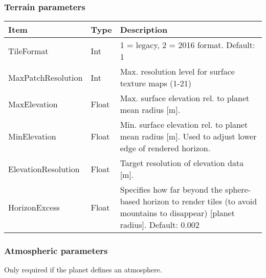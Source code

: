 \documentclass[Orbiter Developer Manual.tex]{subfiles}
\begin{document}
\subsubsection*{Terrain parameters}
	\begin{longtable}{ |p{}|p{}|p{}| }
	\hline\rule{0pt}{2ex}
	\textbf{Item} & \textbf{Type} & \textbf{Description}\\
	\hline\rule{0pt}{2ex}
	TileFormat & Int & 1 = legacy, 2 = 2016 format. Default: 1\\
	\hline\rule{0pt}{2ex}
	MaxPatchResolution & Int & Max. resolution level for surface texture maps (1-21)\\
	\hline\rule{0pt}{2ex}
	MaxElevation & Float & Max. surface elevation rel. to planet mean radius [m].\\
	\hline\rule{0pt}{2ex}
	MinElevation & Float & Min. surface elevation rel. to planet mean radius [m]. Used to adjust lower edge of rendered horizon.\\
	\hline\rule{0pt}{2ex}
	ElevationResolution & Float & Target resolution of elevation data [m].\\
	\hline\rule{0pt}{2ex}
	HorizonExcess & Float & Specifies how far beyond the sphere-based horizon to render tiles (to avoid mountains to disappear) [planet radius]. Default: 0.002\\
	\hline
	\end{longtable}


\subsubsection*{Atmospheric parameters}
Only required if the planet defines an atmosphere.
\end{document}
